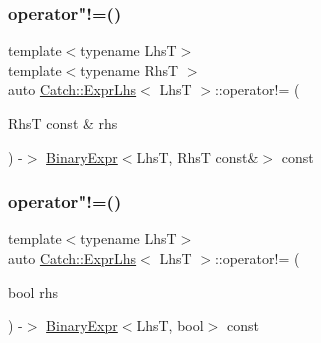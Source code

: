 \mbox{\label{class_catch_1_1_expr_lhs_a5e10eab8aed53dd000b89d8fd7754437}} 
\subsubsection{\texorpdfstring{operator"!=()}{operator!=()}\hspace{0.1cm}{\footnotesize\ttfamily [1/2]}}
{\footnotesize\ttfamily template$<$typename LhsT$>$ \\
template$<$typename RhsT $>$ \\
auto \mbox{\hyperlink{class_catch_1_1_expr_lhs}{Catch\+::\+Expr\+Lhs}}$<$ LhsT $>$\+::operator!= (\begin{DoxyParamCaption}\item[{RhsT const \&}]{rhs }\end{DoxyParamCaption}) -\/$>$ \mbox{\hyperlink{class_catch_1_1_binary_expr}{Binary\+Expr}}$<$LhsT, RhsT const\&$>$ const \hspace{0.3cm}{\ttfamily [inline]}}

\mbox{\label{class_catch_1_1_expr_lhs_a60eca847201d057d8a8b7222c69b619c}} 
\subsubsection{\texorpdfstring{operator"!=()}{operator!=()}\hspace{0.1cm}{\footnotesize\ttfamily [2/2]}}
{\footnotesize\ttfamily template$<$typename LhsT$>$ \\
auto \mbox{\hyperlink{class_catch_1_1_expr_lhs}{Catch\+::\+Expr\+Lhs}}$<$ LhsT $>$\+::operator!= (\begin{DoxyParamCaption}\item[{bool}]{rhs }\end{DoxyParamCaption}) -\/$>$ \mbox{\hyperlink{class_catch_1_1_binary_expr}{Binary\+Expr}}$<$LhsT, bool$>$ const \hspace{0.3cm}{\ttfamily [inline]}}

\mbox{\label{class_catch_1_1_expr_lhs_a6ed35a83c811df0c1187ff727ef83e65}} 
